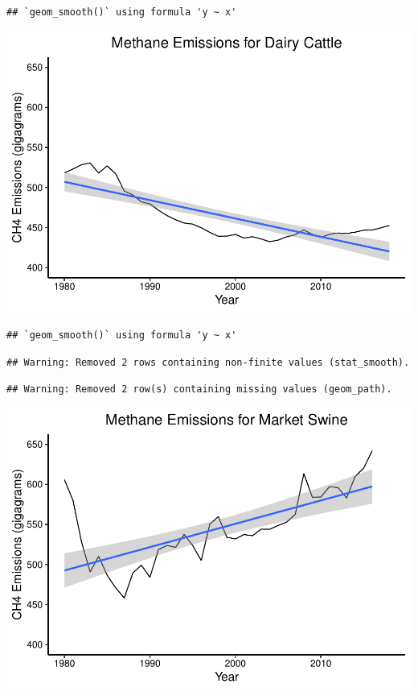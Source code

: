 \documentclass[
  12pt,
]{article}
\begin{document}
\begin{verbatim}
## `geom_smooth()` using formula 'y ~ x'
\end{verbatim}

\includegraphics{Methane_Project_Template_files/figure-latex/dairy.cattle.ts-1.pdf}

\begin{verbatim}
## `geom_smooth()` using formula 'y ~ x'
\end{verbatim}

\begin{verbatim}
## Warning: Removed 2 rows containing non-finite values (stat_smooth).
\end{verbatim}

\begin{verbatim}
## Warning: Removed 2 row(s) containing missing values (geom_path).
\end{verbatim}

\includegraphics{Methane_Project_Template_files/figure-latex/market.swine.ts-1.pdf}
\end{document}
